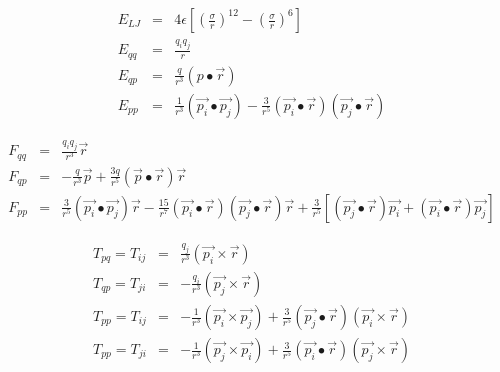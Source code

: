 \documentclass[12pt]{article}
\begin{document}
\begin{eqnarray*}
E_{LJ} & = & 4 \epsilon \left[ \left(\frac{\sigma}{r}\right)^{12} - 
                        \left(\frac{\sigma}{r}\right)^6 \right] \\
E_{qq} & = & \frac{q_i q_j}{r} \\
E_{qp} & = & \frac{q}{r^3} (p \bullet \vec{r}) \\
E_{pp} & = & \frac{1}{r^3} (\vec{p_i} \bullet \vec{p_j}) - 
             \frac{3}{r^5} (\vec{p_i} \bullet \vec{r}) (\vec{p_j} \bullet \vec{r}) 
\end{eqnarray*}                           

\begin{eqnarray*}
F_{qq} & = & \frac{q_i q_j}{r^3} \vec{r} \\
F_{qp} & = & -\frac{q}{r^3} \vec{p} + \frac{3q}{r^5} 
             (\vec{p} \bullet \vec{r}) \vec{r} \\
F_{pp} & = & \frac{3}{r^5} (\vec{p_i} \bullet \vec{p_j}) \vec{r} -
             \frac{15}{r^7} (\vec{p_i} \bullet \vec{r}) 
	     (\vec{p_j} \bullet \vec{r}) \vec{r} + 
             \frac{3}{r^5} \left[ (\vec{p_j} \bullet \vec{r}) \vec{p_i} + 
             (\vec{p_i} \bullet \vec{r}) \vec{p_j} \right]
\end{eqnarray*}                           

\begin{eqnarray*}
T_{pq} = T_{ij} & = & \frac{q_j}{r^3} (\vec{p_i} \times \vec{r}) \\
T_{qp} = T_{ji} & = & - \frac{q_i}{r^3} (\vec{p_j} \times \vec{r}) \\
T_{pp} = T_{ij} & = & -\frac{1}{r^3} (\vec{p_i} \times \vec{p_j}) + 
                      \frac{3}{r^5} (\vec{p_j} \bullet \vec{r})
		      (\vec{p_i} \times \vec{r}) \\
T_{pp} = T_{ji} & = & -\frac{1}{r^3} (\vec{p_j} \times \vec{p_i}) + 
                      \frac{3}{r^5} (\vec{p_i} \bullet \vec{r}) 
		      (\vec{p_j} \times \vec{r}) \\
\end{eqnarray*}                           
\end{document}
